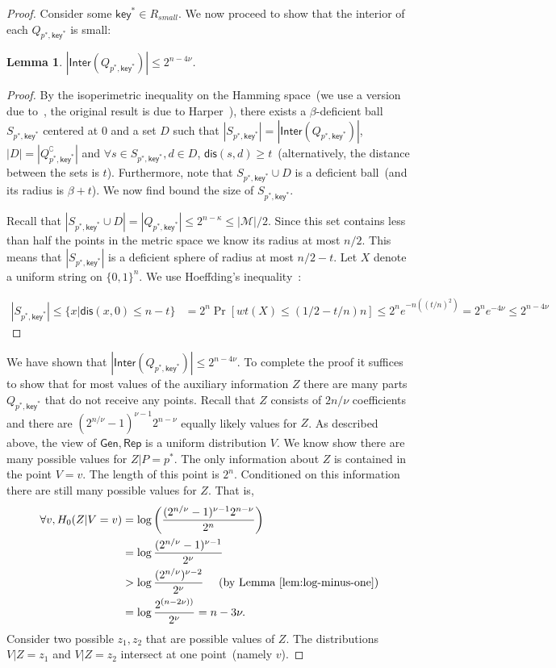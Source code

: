 \documentclass[11pt]{article}
\newcommand{\lemref}[1]{\mbox{Lemma~\ref{#1}}}
\newcommand{\class}[1]{{\ensuremath{\mathsf{#1}}}}
\newcommand{\key}{\ensuremath{\class{key}}\xspace}
\newcommand{\gen}{\ensuremath{\class{Gen}}\xspace}
\newcommand{\rep}{\ensuremath{\class{Rep}}\xspace}
\newcommand{\inter}{\ensuremath{\class{Inter}}\xspace}
\newcommand{\zo}{\ensuremath{\{0, 1\}}}
\newcommand{\dis}{\ensuremath{\mathsf{dis}}}
\newtheorem{lemma}[theorem]{Lemma}
\begin{document}
\begin{proof}
Consider some $\key^*\in R_{small}$.  
We now proceed to show that the interior of each $Q_{p^*, \key^*}$ is small:

\begin{lemma}
$|\inter(Q_{p^*, \key^*})| \le 2^{n-4\nu}$.
\end{lemma}
\begin{proof}
By the isoperimetric inequality on the Hamming space~(we use a version due to~\cite[Theorem 1]{frankl1981short}, the original result is due to Harper~\cite{harper1966optimal}), there exists a $\beta$-deficient ball $S_{p^*, \key^*}$ centered at $0$ and a set $D$ such that $|S_{p^*, \key^*}| = |\inter(Q_{p^*, \key^*})|$, $|D| = |Q_{p^*, \key^*}^\complement|$ and $\forall s\in S_{p^*, \key^*}, d\in D$, $\dis(s, d) \ge t$~(alternatively, the distance between the sets is $t$).  Furthermore, note that $S_{p^*, \key^*} \cup D$ is a deficient ball~(and its radius is $\beta+t$).
We now find bound the size of $S_{p^*, \key^*}$.

Recall that $|S_{p^*, \key^*} \cup D| = |Q_{p^*, \key^*} | \le 2^{n-\kappa}\leq |\mathcal{M}|/2$.  Since this set contains less than half the points in the metric space we know its radius at most $n/2$.  This means that $|S_{p^*, \key^*}|$ is a deficient sphere of radius at most $n/2-t$.  Let $X$ denote a uniform string on $\zo^n$.  We use Hoeffding's inequality~\cite{hoeffding1963probability}:

\begin{align*}
|S_{p^*, \key^*}| \le \{ x | \dis (x, 0)\le n-t\} &= 2^n \Pr[ wt(X) \le (1/2-t/n)n] \le 2^n e^{-n ((t/n)^2)} = 2^n e^{-4\nu} \le 2^{n - 4\nu}
\end{align*}
\end{proof}

We have shown that $|\inter(Q_{p^*, \key^*})| \le 2^{n-4\nu}$.  
To complete the proof it suffices to show that for most values of the auxiliary information $Z$ there are many parts $Q_{p^*, \key^*}$ that do not receive any points.  
Recall that $Z$ consists of $2n/\nu$ coefficients and there are $(2^{n/\nu}-1)^{\nu-1} 2^{n-\nu}$ equally likely values for $Z$.
 As described above, the view of $\gen, \rep$ is a uniform distribution $V$.  We know show there are many possible values for $Z |P=p^*$.  The only information about $Z$ is contained in the point  $V=v$.  The length of this point is $2^n$.  Conditioned on this information there are still many possible values for $Z$.  That is, 
 \begin{align*}
 \forall v, H_0(Z | V=v) &=\log \left(\frac{(2^{n/\nu}-1)^{\nu-1} 2^{n-\nu}}{2^n} \right)\\
  &= \log \frac{(2^{n/\nu}-1)^{\nu-1}}{2^{\nu}} \\
  &>\log  \frac{(2^{n/\nu})^{\nu-2}}{2^{\nu}} \ \ \ \ \mbox{(by \lemref{lem:log-minus-one})}\\
  &=\log \frac{2^{(n-2\nu))}}{2^\nu} = n -3\nu.
 \end{align*}
Consider two possible $z_1, z_2$ that are possible values of $Z$.  The distributions $V| Z=z_1$ and $V | Z=z_2$ intersect at one point~(namely $v$).  


\end{proof}
\end{document}
